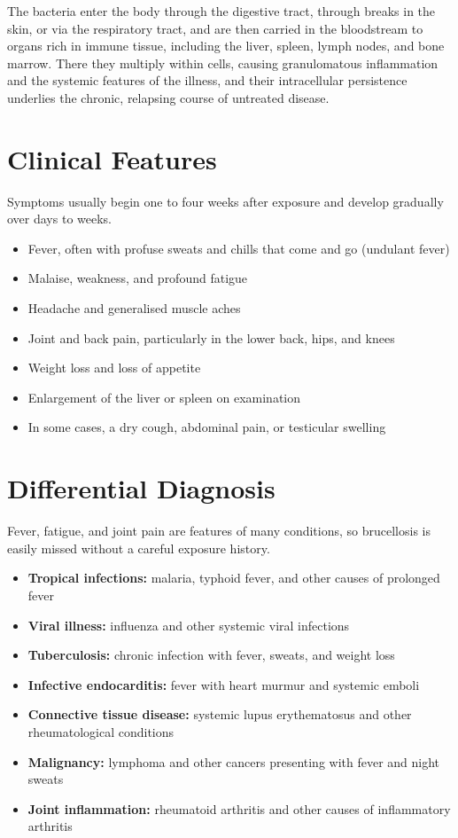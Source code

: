 The bacteria enter the body through the digestive tract, through breaks in the skin, or via the respiratory tract, and are then carried in the bloodstream to organs rich in immune tissue, including the liver, spleen, lymph nodes, and bone marrow. There they multiply within cells, causing granulomatous inflammation and the systemic features of the illness, and their intracellular persistence underlies the chronic, relapsing course of untreated disease.

\section*{Clinical Features}
Symptoms usually begin one to four weeks after exposure and develop gradually over days to weeks.

\begin{itemize}
    \item Fever, often with profuse sweats and chills that come and go (undulant fever)
    \item Malaise, weakness, and profound fatigue
    \item Headache and generalised muscle aches
    \item Joint and back pain, particularly in the lower back, hips, and knees
    \item Weight loss and loss of appetite
    \item Enlargement of the liver or spleen on examination
    \item In some cases, a dry cough, abdominal pain, or testicular swelling
\end{itemize}

\section*{Differential Diagnosis}
Fever, fatigue, and joint pain are features of many conditions, so brucellosis is easily missed without a careful exposure history.

\begin{itemize}
    \item \textbf{Tropical infections:} malaria, typhoid fever, and other causes of prolonged fever
    \item \textbf{Viral illness:} influenza and other systemic viral infections
    \item \textbf{Tuberculosis:} chronic infection with fever, sweats, and weight loss
    \item \textbf{Infective endocarditis:} fever with heart murmur and systemic emboli
    \item \textbf{Connective tissue disease:} systemic lupus erythematosus and other rheumatological conditions
    \item \textbf{Malignancy:} lymphoma and other cancers presenting with fever and night sweats
    \item \textbf{Joint inflammation:} rheumatoid arthritis and other causes of inflammatory arthritis
\end{itemize}

